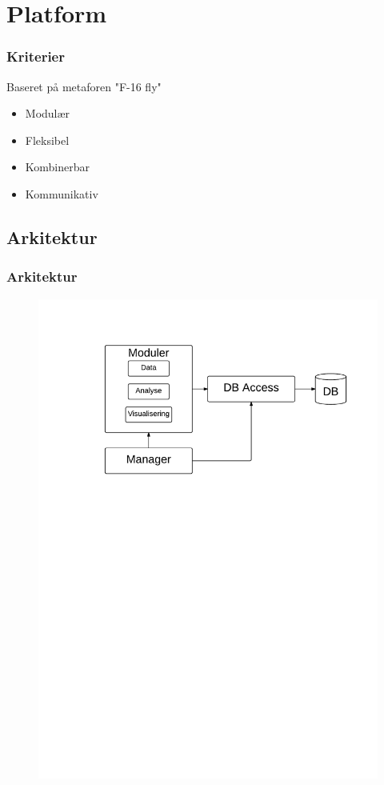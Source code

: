 \section{Platform}
\begin{frame}
\frametitle{Kriterier}
Baseret på metaforen "F-16 fly"
\begin{itemize}
\item Modulær
\item Fleksibel
\item Kombinerbar
\item Kommunikativ
\end{itemize}
\end{frame}

\subsection{Arkitektur}

\begin{frame}
\frametitle{Arkitektur}
\begin{figure}[h]
	\centering						%
	\includegraphics[scale=0.5, trim = 1cm 17.5cm 1cm 1cm, clip]{../graphics/Arkitektur}
\end{figure}
\end{frame}

